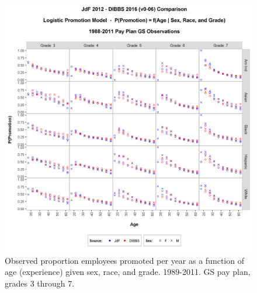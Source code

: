 \documentclass[10pt, letterpaper]{article}
\begin{document}
\begin{spacing}{1.0}
\begin{itemize}
\end{itemize}

\clearpage

\begin{figure}[]
    \centering
    \includegraphics[width=6in, trim={0 0 0 1in}, clip]{PromotionSexRaceageGS3-7Observed.png}
    \caption{Observed proportion employees promoted per year as a function of age (experience) given sex, race, and grade.  1989-2011.  GS pay plan, grades 3 through 7.}
    \label{figure:PromotionSexRaceageGS3-7Observed}
\end{figure}

\clearpage


\end{spacing}
\end{document}
